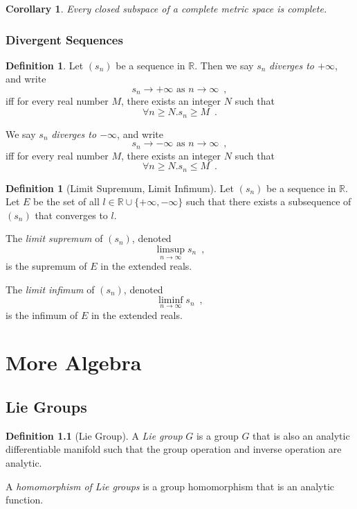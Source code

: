 \documentclass{book}
\newtheorem{cor}{Corollary}[prop]
\theoremstyle{definition}
\newtheorem{df}[prop]{Definition}
\begin{document}
\begin{cor}
Every closed subspace of a complete metric space is complete.
\end{cor}

\section{Divergent Sequences}

\begin{df}
Let $(s_n)$ be a sequence in $\mathbb{R}$. Then we say $s_n$ \emph{diverges to $+\infty$}, and write
\[ s_n \rightarrow + \infty \text{ as } n \rightarrow \infty \enspace , \]
iff for every real number $M$, there exists an integer $N$ such that
\[ \forall n \geq N. s_n \geq M \enspace . \]

We say $s_n$ \emph{diverges to $-\infty$}, and write
\[ s_n \rightarrow - \infty \text{ as } n \rightarrow \infty \enspace , \]
iff for every real number $M$, there exists an integer $N$ such that
\[ \forall n \geq N. s_n \leq M \enspace . \]
\end{df}

\begin{df}[Limit Supremum, Limit Infimum]
Let $(s_n)$ be a sequence in $\mathbb{R}$. Let $E$ be the set of all $l \in \mathbb{R} \cup \{ + \infty, - \infty \}$ such that there exists a subsequence of $(s_n)$ that converges to $l$.

The \emph{limit supremum} of $(s_n)$, denoted
\[ \limsup_{n \rightarrow \infty} s_n \enspace , \]
is the supremum of $E$ in the extended reals.

The \emph{limit infimum} of $(s_n)$, denoted
\[ \liminf_{n \rightarrow \infty} s_n \enspace , \]
is the infimum of $E$ in the extended reals.
\end{df}

\part{More Algebra}

\chapter{Lie Groups}

\begin{df}[Lie Group]
A \emph{Lie group} $G$ is a group $G$ that is also an analytic differentiable manifold such that the group operation and inverse operation are analytic.

A \emph{homomorphism of Lie groups} is a group homomorphism that is an analytic function.
\end{df}
\end{document}
